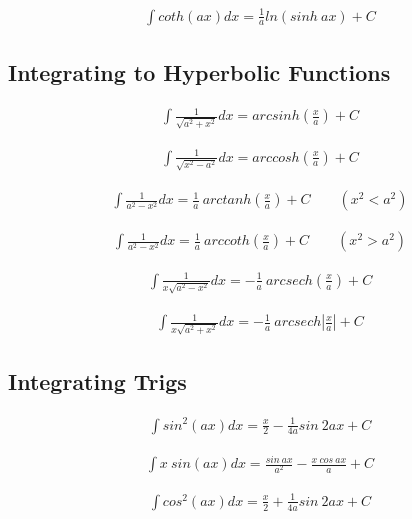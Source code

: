 \documentclass{article}
\begin{document}
\begin{align*}
    \int coth(ax) dx = \frac{1}{a} ln(sinh \ ax) + C
\end{align*}

\subsection{Integrating to Hyperbolic Functions}

\begin{align*}
    \int \frac{1}{\sqrt{a^2+x^2}} dx = arcsinh(\frac{x}{a}) + C
\end{align*}

\begin{align*}
    \int \frac{1}{\sqrt{x^2-a^2}} dx = arccosh(\frac{x}{a}) + C
\end{align*}

\begin{align*}
    \int \frac{1}{a^2-x^2} dx = \frac{1}{a} \ arctanh(\frac{x}{a}) + C \qquad (x^2<a^2)
\end{align*}

\begin{align*}
    \int \frac{1}{a^2-x^2} dx = \frac{1}{a} \ arccoth(\frac{x}{a}) + C \qquad (x^2>a^2)
\end{align*}

\begin{align*}
    \int \frac{1}{x\sqrt{a^2-x^2}} dx = -\frac{1}{a} \ arcsech(\frac{x}{a}) + C
\end{align*}

\begin{align*}
    \int \frac{1}{x\sqrt{a^2+x^2}} dx = -\frac{1}{a} \ arcsech|\frac{x}{a}| + C
\end{align*}
\newline

\subsection{Integrating Trigs}

\begin{align*}
    \int sin^2(ax) dx = \frac{x}{2} - \frac{1}{4a} sin \ 2ax + C
\end{align*}

\begin{align*}
    \int x \ sin(ax) dx = \frac{sin \ ax}{a^2} - \frac{x \ cos \ ax}{a}+ C
\end{align*}

\begin{align*}
    \int cos^2(ax) dx = \frac{x}{2} + \frac{1}{4a} sin \ 2ax + C
\end{align*}
\end{document}

